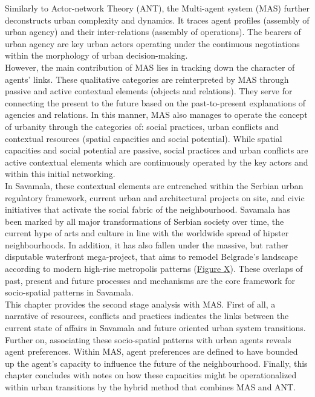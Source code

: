 \documentclass[11pt]{report}
\begin{document}
{{{{Similarly to Actor-network Theory (ANT), the Multi-agent system (MAS) further deconstructs urban complexity and dynamics. It traces agent profiles (assembly of urban agency) and their inter-relations (assembly of operations). The bearers of urban agency are key urban actors operating under the continuous negotiations within the morphology of urban decision-making.
\\

However, the main contribution of MAS lies in tracking down the character of agents’ links. These qualitative categories are reinterpreted by MAS through passive and active contextual elements (objects and relations). They serve for connecting the present to the future based on the past-to-present explanations of agencies and relations. In this manner, MAS also manages to operate the concept of urbanity through the categories of: social practices, urban conflicts and contextual resources (spatial capacities and social potential). While spatial capacities and social potential are passive, social practices and urban conflicts are active contextual elements which are continuously operated by the key actors and within this initial networking.
\\

In Savamala, these contextual elements are entrenched within the Serbian urban regulatory framework, current urban and architectural projects on site, and civic initiatives that activate the social fabric of the neighbourhood. Savamala has been marked by all major transformations of Serbian society over time, the current hype of arts and culture in line with the worldwide spread of hipster neighbourhoods. In addition, it has also fallen under the massive, but rather disputable waterfront mega-project, that aims to remodel Belgrade’s landscape according to modern high-rise metropolis patterns (\href{Figure Belgrade and Savamala}{Figure X}). %
These overlaps of past, present and future processes and mechanisms are the core framework for socio-spatial patterns in Savamala.
\\

This chapter provides the second stage analysis with MAS. First of all, a narrative of resources, conflicts and practices indicates the links between the current state of affairs in Savamala and future oriented urban system transitions. Further on, associating these socio-spatial patterns with urban agents reveals agent preferences. Within MAS, agent preferences are defined to have bounded up the agent’s capacity to influence the future of the neighbourhood. Finally, this chapter concludes with notes on how these capacities might be operationalized within urban transitions by the hybrid method that combines MAS and ANT.

}}}}
\end{document}
